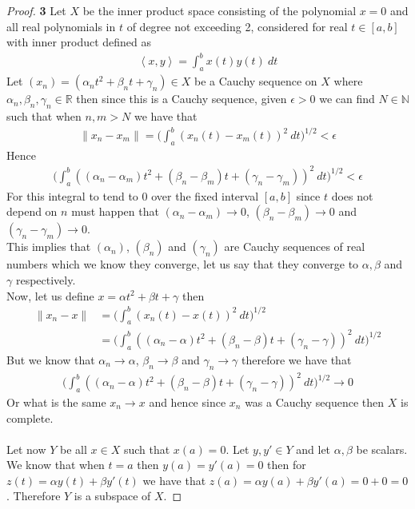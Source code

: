 \documentclass[11pt]{article}
\newcommand{\N}{\mathbb{N}}
\newcommand{\R}{\mathbb{R}}
\newcommand{\inprd}[1]{\left\langle{#1}\right\rangle}
\theoremstyle{definition}
\begin{document}
\cleardoublepage
\begin{proof}{\textbf{3}}
Let $X$ be the inner product space consisting of the polynomial $x = 0$ and all
real polynomials in $t$ of degree not exceeding 2, considered for real
$t \in [a,b]$ with inner product defined as 
\begin{align*}
    \inprd{x,y} = \int_a^b x(t)y(t)~dt
\end{align*}
Let $(x_n) = (\alpha_n t^2 + \beta_n t + \gamma_n) \in X$ be a Cauchy sequence
on $X$ where $\alpha_n, \beta_n, \gamma_n \in \R$ then since this is a Cauchy
sequence, given $\epsilon > 0$ we can find $N \in \N$ such that when $n,m > N$
we have that
\begin{align*}
    \|x_n - x_m\| = \bigg(\int_a^b (x_n(t) - x_m(t))^2~dt\bigg)^{1/2}
    < \epsilon
\end{align*}
Hence
\begin{align*}
    \bigg(\int_a^b ((\alpha_n - \alpha_m)t^2 + (\beta_n - \beta_m)t + (\gamma_n - \gamma_m))^2~dt\bigg)^{1/2}
    < \epsilon
\end{align*}
For this integral to tend to 0 over the fixed interval $[a,b]$  since $t$ does
not depend on $n$ must happen that
$(\alpha_n - \alpha_m) \to 0$, $(\beta_n - \beta_m) \to 0$ and
$(\gamma_n - \gamma_m) \to 0$.
\\
This implies that $(\alpha_n)$, $(\beta_n)$ and $(\gamma_n)$ are Cauchy
sequences of real numbers which we know they converge,
let us say that they converge to $\alpha, \beta$ and $\gamma$ respectively.
\\
Now, let us define $x = \alpha t^2 + \beta t + \gamma$ then
\begin{align*}
    \|x_n - x\| &= \bigg(\int_a^b (x_n(t) - x(t))^2~dt\bigg)^{1/2}\\
    &= \bigg(\int_a^b ((\alpha_n - \alpha)t^2 + (\beta_n - \beta)t + (\gamma_n - \gamma))^2~dt\bigg)^{1/2}
\end{align*}
But we know that $\alpha_n \to \alpha$, $\beta_n \to \beta$ and
$\gamma_n \to \gamma$ therefore we have that
\begin{align*}
    \bigg(\int_a^b ((\alpha_n - \alpha)t^2 + (\beta_n - \beta)t + (\gamma_n - \gamma))^2~dt\bigg)^{1/2}
    \to 0 
\end{align*}
Or what is the same $x_n \to x$ and hence since $x_n$ was a Cauchy sequence
then $X$ is complete.
\\\\
Let now $Y$ be all $x \in X$ such that $x(a) = 0$. Let $y, y' \in Y$ and let
$\alpha, \beta$ be scalars. We know that when $t = a$ then $y(a) = y'(a) = 0$ then
for $z(t) = \alpha y(t) + \beta y'(t)$ we have that
$z(a) = \alpha y(a) + \beta y'(a) = 0 + 0 = 0$.
Therefore $Y$ is a subspace of $X$.


\end{proof}
\end{document}
